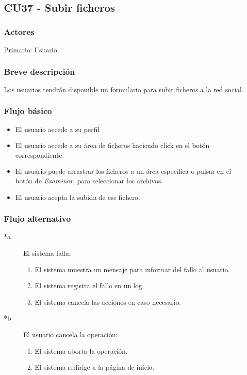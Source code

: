 \documentclass[12pt, a4paper, titlepage]{article}
\begin{document}
\subsection{CU37 - Subir ficheros}
\subsubsection{Actores}
Primario: Usuario.
\subsubsection{Breve descripción}

Los usuarios tendrán disponible un formulario para subir ficheros a la red social.
\subsubsection{Flujo básico}
	\begin{itemize}
		\item El usuario accede a su perfil
		\item El usuario accede a su área de ficheros haciendo click en el botón correspondiente.
		\item El usuario puede arrastrar los ficheros a un área específica o pulsar en el botón de \textit{Examinar}, para seleccionar los archivos.
		\item El usuario acepta la subida de ese fichero.
	\end{itemize}

\subsubsection{Flujo alternativo}
	\begin{description}
	\item [*a] El sistema falla:
	\begin{enumerate}
		\item El sistema muestra un mensaje para informar del fallo al usuario.
		\item El sistema registra el fallo en un log.
		\item El sistema cancela las acciones en caso necesario.
	\end{enumerate}
\end{description}

\begin{description}
	\item [*b] El usuario cancela la operación:
	\begin{enumerate}
		\item El sistema aborta la operación.
		\item El sistema redirige a la página de inicio.
	\end{enumerate}
\end{description}
\end{document}
